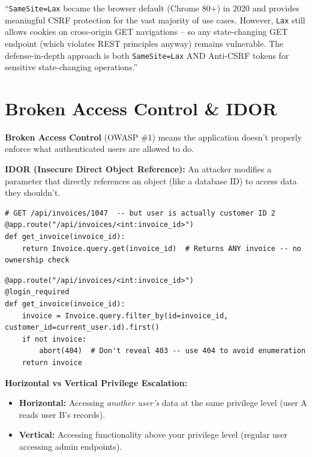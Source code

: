 \documentclass[11pt, letterpaper]{article}
\newcommand{\talkingpoint}[1]{%
  \begin{tcolorbox}[colback=talkbg, colframe=talkborder,
    title={\bfseries Interview Talking Point}, arc=3pt, boxrule=1pt]
  #1
  \end{tcolorbox}%
}
\begin{document}
\talkingpoint{``\texttt{SameSite=Lax} became the browser default (Chrome 80+) in 2020 and provides meaningful CSRF protection for the vast majority of use cases. However, \texttt{Lax} still allows cookies on cross-origin GET navigations -- so any state-changing GET endpoint (which violates REST principles anyway) remains vulnerable. The defense-in-depth approach is both \texttt{SameSite=Lax} AND Anti-CSRF tokens for sensitive state-changing operations.''}

\section*{Broken Access Control \& IDOR}

\textbf{Broken Access Control} (OWASP \#1) means the application doesn't properly enforce what authenticated users are allowed to do.

\textbf{IDOR (Insecure Direct Object Reference):} An attacker modifies a parameter that directly references an object (like a database ID) to access data they shouldn't.

\begin{lstlisting}[style=vuln, caption={VULNERABLE: trusts user-supplied ID without authorization check}]
# GET /api/invoices/1047  -- but user is actually customer ID 2
@app.route("/api/invoices/<int:invoice_id>")
def get_invoice(invoice_id):
    return Invoice.query.get(invoice_id)  # Returns ANY invoice -- no ownership check
\end{lstlisting}

\begin{lstlisting}[style=safe, caption={SECURE: always verify the requesting user owns the resource}]
@app.route("/api/invoices/<int:invoice_id>")
@login_required
def get_invoice(invoice_id):
    invoice = Invoice.query.filter_by(id=invoice_id, customer_id=current_user.id).first()
    if not invoice:
        abort(404)  # Don't reveal 403 -- use 404 to avoid enumeration
    return invoice
\end{lstlisting}

\textbf{Horizontal vs Vertical Privilege Escalation:}
\begin{itemize}[noitemsep]
  \item \textbf{Horizontal:} Accessing \emph{another user's} data at the same privilege level (user A reads user B's records).
  \item \textbf{Vertical:} Accessing functionality above your privilege level (regular user accessing admin endpoints).
\end{itemize}
\end{document}
